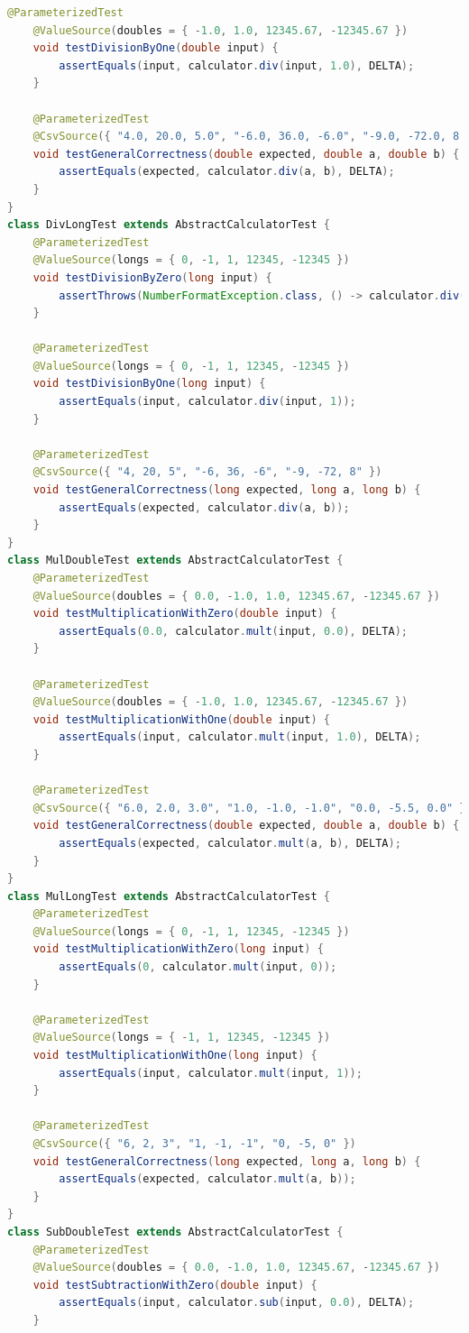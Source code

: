 \documentclass[a4paper]{article}
\begin{document}
\begin{lstlisting}[language=Java]
    @ParameterizedTest
    @ValueSource(doubles = { -1.0, 1.0, 12345.67, -12345.67 })
    void testDivisionByOne(double input) {
        assertEquals(input, calculator.div(input, 1.0), DELTA);
    }

    @ParameterizedTest
    @CsvSource({ "4.0, 20.0, 5.0", "-6.0, 36.0, -6.0", "-9.0, -72.0, 8.0" })
    void testGeneralCorrectness(double expected, double a, double b) {
        assertEquals(expected, calculator.div(a, b), DELTA);
    }
}
class DivLongTest extends AbstractCalculatorTest {
    @ParameterizedTest
    @ValueSource(longs = { 0, -1, 1, 12345, -12345 })
    void testDivisionByZero(long input) {
        assertThrows(NumberFormatException.class, () -> calculator.div(input, 0));
    }

    @ParameterizedTest
    @ValueSource(longs = { 0, -1, 1, 12345, -12345 })
    void testDivisionByOne(long input) {
        assertEquals(input, calculator.div(input, 1));
    }

    @ParameterizedTest
    @CsvSource({ "4, 20, 5", "-6, 36, -6", "-9, -72, 8" })
    void testGeneralCorrectness(long expected, long a, long b) {
        assertEquals(expected, calculator.div(a, b));
    }
}
class MulDoubleTest extends AbstractCalculatorTest {
    @ParameterizedTest
    @ValueSource(doubles = { 0.0, -1.0, 1.0, 12345.67, -12345.67 })
    void testMultiplicationWithZero(double input) {
        assertEquals(0.0, calculator.mult(input, 0.0), DELTA);
    }

    @ParameterizedTest
    @ValueSource(doubles = { -1.0, 1.0, 12345.67, -12345.67 })
    void testMultiplicationWithOne(double input) {
        assertEquals(input, calculator.mult(input, 1.0), DELTA);
    }

    @ParameterizedTest
    @CsvSource({ "6.0, 2.0, 3.0", "1.0, -1.0, -1.0", "0.0, -5.5, 0.0" })
    void testGeneralCorrectness(double expected, double a, double b) {
        assertEquals(expected, calculator.mult(a, b), DELTA);
    }
}
class MulLongTest extends AbstractCalculatorTest {
    @ParameterizedTest
    @ValueSource(longs = { 0, -1, 1, 12345, -12345 })
    void testMultiplicationWithZero(long input) {
        assertEquals(0, calculator.mult(input, 0));
    }

    @ParameterizedTest
    @ValueSource(longs = { -1, 1, 12345, -12345 })
    void testMultiplicationWithOne(long input) {
        assertEquals(input, calculator.mult(input, 1));
    }

    @ParameterizedTest
    @CsvSource({ "6, 2, 3", "1, -1, -1", "0, -5, 0" })
    void testGeneralCorrectness(long expected, long a, long b) {
        assertEquals(expected, calculator.mult(a, b));
    }
}
class SubDoubleTest extends AbstractCalculatorTest {
    @ParameterizedTest
    @ValueSource(doubles = { 0.0, -1.0, 1.0, 12345.67, -12345.67 })
    void testSubtractionWithZero(double input) {
        assertEquals(input, calculator.sub(input, 0.0), DELTA);
    }


\end{lstlisting}
\end{document}

